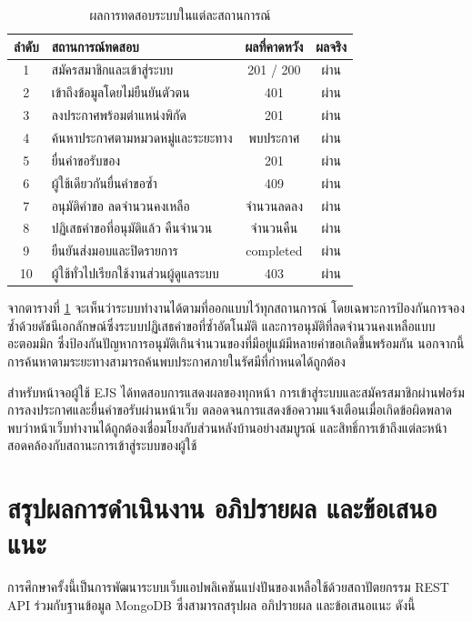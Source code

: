 \documentclass[12pt,a4paper]{report}
\begin{document}
\begin{table}[htbp]
\centering
\caption{ผลการทดสอบระบบในแต่ละสถานการณ์}
\label{tab:test}
\begin{tabularx}{\textwidth}{c X c c}
\toprule
\textbf{ลำดับ} & \textbf{สถานการณ์ทดสอบ} & \textbf{ผลที่คาดหวัง} & \textbf{ผลจริง}\\
\midrule
1 & สมัครสมาชิกและเข้าสู่ระบบ & 201 / 200 & ผ่าน\\
2 & เข้าถึงข้อมูลโดยไม่ยืนยันตัวตน & 401 & ผ่าน\\
3 & ลงประกาศพร้อมตำแหน่งพิกัด & 201 & ผ่าน\\
4 & ค้นหาประกาศตามหมวดหมู่และระยะทาง & พบประกาศ & ผ่าน\\
5 & ยื่นคำขอรับของ & 201 & ผ่าน\\
6 & ผู้ใช้เดียวกันยื่นคำขอซ้ำ & 409 & ผ่าน\\
7 & อนุมัติคำขอ ลดจำนวนคงเหลือ & จำนวนลดลง & ผ่าน\\
8 & ปฏิเสธคำขอที่อนุมัติแล้ว คืนจำนวน & จำนวนคืน & ผ่าน\\
9 & ยืนยันส่งมอบและปิดรายการ & completed & ผ่าน\\
10 & ผู้ใช้ทั่วไปเรียกใช้งานส่วนผู้ดูแลระบบ & 403 & ผ่าน\\
\bottomrule
\end{tabularx}
\end{table}

จากตารางที่ \ref{tab:test} จะเห็นว่าระบบทำงานได้ตามที่ออกแบบไว้ทุกสถานการณ์ โดยเฉพาะการป้องกันการจองซ้ำด้วยดัชนีเอกลักษณ์ซึ่งระบบปฏิเสธคำขอที่ซ้ำอัตโนมัติ และการอนุมัติที่ลดจำนวนคงเหลือแบบอะตอมมิก ซึ่งป้องกันปัญหาการอนุมัติเกินจำนวนของที่มีอยู่แม้มีหลายคำขอเกิดขึ้นพร้อมกัน นอกจากนี้การค้นหาตามระยะทางสามารถค้นพบประกาศภายในรัศมีที่กำหนดได้ถูกต้อง

สำหรับหน้าจอผู้ใช้ EJS ได้ทดสอบการแสดงผลของทุกหน้า การเข้าสู่ระบบและสมัครสมาชิกผ่านฟอร์ม การลงประกาศและยื่นคำขอรับผ่านหน้าเว็บ ตลอดจนการแสดงข้อความแจ้งเตือนเมื่อเกิดข้อผิดพลาด พบว่าหน้าเว็บทำงานได้ถูกต้องเชื่อมโยงกับส่วนหลังบ้านอย่างสมบูรณ์ และสิทธิ์การเข้าถึงแต่ละหน้าสอดคล้องกับสถานะการเข้าสู่ระบบของผู้ใช้

\chapter{สรุปผลการดำเนินงาน อภิปรายผล และข้อเสนอแนะ}

การศึกษาครั้งนี้เป็นการพัฒนาระบบเว็บแอปพลิเคชันแบ่งปันของเหลือใช้ด้วยสถาปัตยกรรม REST API ร่วมกับฐานข้อมูล MongoDB ซึ่งสามารถสรุปผล อภิปรายผล และข้อเสนอแนะ ดังนี้
\end{document}
